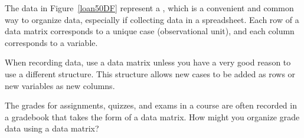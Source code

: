 

The data in Figure~\ref{loan50DF} represent a ,
which is a convenient and common way to organize data,
especially if collecting data in a spreadsheet.
Each row of a data matrix corresponds to a unique case
(observational unit),
and each column corresponds to a variable.


When recording data, use a data matrix unless you have
a very good reason to use a different structure.
This structure allows new cases to be added as rows
or new variables as new columns.

\begin{exercisewrap}
\begin{nexercise}
The grades for assignments, quizzes, and exams in a course are
often recorded in a gradebook that takes the form of a data matrix.
How might you organize grade data using a data
matrix?\footnotemark
\end{nexercise}
\end{exercisewrap}

